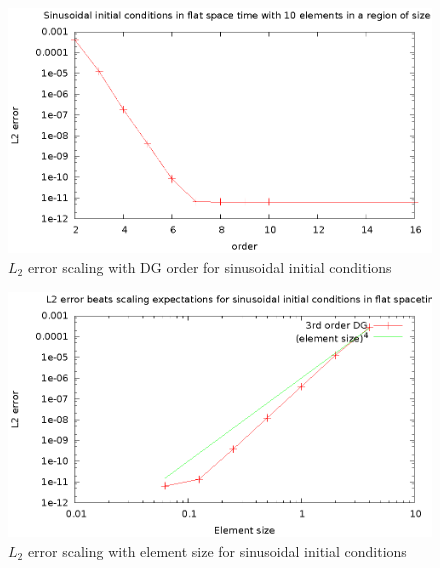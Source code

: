 \begin{figure}
  \includegraphics{sinL2WTorder}
  \caption{$L_2$ error scaling with DG order for sinusoidal initial conditions}
\end{figure}

\begin{figure}
  \includegraphics{sinL2WTelement}
  \caption{$L_2$ error scaling with element size for sinusoidal initial conditions}
\end{figure}



